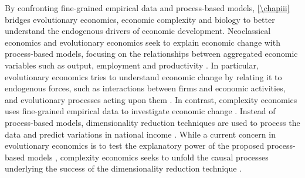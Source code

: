 % 
By confronting fine-grained empirical data and process-based models, \cref{\chapiii} bridges evolutionary economics, economic complexity and biology to better understand the endogenous drivers of economic development.
% 
% 
% 
Neoclassical economics and evolutionary economics seek to explain economic change with process-based models, focusing on the relationships between aggregated economic variables such as output, employment and productivity \citep{Boschma2005a}.
% 
% 
In particular, evolutionary economics tries to understand economic change by relating it to endogenous forces, such as interactions between firms and economic activities, and evolutionary processes acting upon them \citep{Hodgson2019,Metcalfe2006}.
% 
% 
In contrast, complexity economics uses fine-grained empirical data to investigate economic change \citep{Hidalgo2021}. Instead of process-based models, dimensionality reduction techniques are used to process the data and predict variations in national income \citep{Mitchell}. 
% 
%
While a current concern in evolutionary economics is to test the explanatory power of the proposed process-based models \cite{Hodgson2019}, complexity economics seeks to unfold the causal processes underlying the success of the dimensionality reduction technique \citep{Hidalgo2021}.

